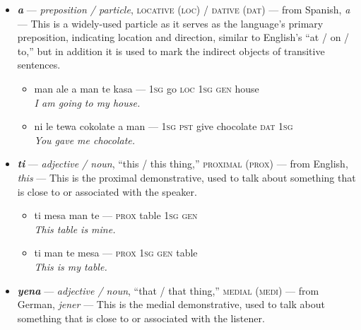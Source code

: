 \documentclass[a4paper]{article}
\begin{document}
\begin{itemize}
\begin{itemize}
		\item ta ni palu-hase kau kau  — \textsc{pl-2} milk-\textsc{vb} cow\textasciitilde{}\textsc{pl} \\\textit{You all are all milking the cows.}
		\item man le hase ni tewa pensi a ye — \textsc{1sg pst caus} \textsc{2sg} give pencil \textsc{dat 3sg} \\\textit{I made you give the pencil to her.}
		\item man le sahin-hase ni te ca — \textsc{1sg pst} hot-\textsc{vb} \textsc{2sg gen} tea \\\textit{I warmed-up your tea.}
	\end{itemize}
	\item \textbf{\textit{a}} — \textit{preposition / particle}, \textsc{locative (loc) / dative (dat)} — from Spanish, \textit{a} — This is a widely-used particle as it serves as the language's primary preposition, indicating location and direction, similar to English's ``at / on / to,'' but in addition it is used to mark the indirect objects of transitive sentences.
	\begin{itemize}
		\item man ale a man te kasa — \textsc{1sg} go \textsc{loc 1sg gen} house \\\textit{I am going to my house.}
		\item ni le tewa cokolate a man — \textsc{1sg pst} give chocolate \textsc{dat 1sg} \\\textit{You gave me chocolate.}
	\end{itemize}
	\item \textbf{\textit{ti}} — \textit{adjective / noun}, ``this / this thing,'' \textsc{proximal (prox)} — from English, \textit{this} — This is the proximal demonstrative, used to talk about something that is close to or associated with the speaker.
	\begin{itemize}
		\item ti mesa man te — \textsc{prox} table \textsc{1sg gen} \\\textit{This table is mine.}
		\item ti man te mesa — \textsc{prox 1sg gen} table \\\textit{This is my table.}
	\end{itemize}
	\item \textbf{\textit{yena}} — \textit{adjective / noun}, ``that / that thing,'' \textsc{medial (medi)}  — from German, \textit{jener} — This is the medial demonstrative, used to talk about something that is close to or associated with the listener.

\end{itemize}
\end{document}

